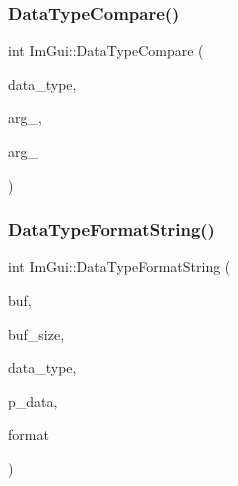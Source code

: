 \mbox{\label{namespaceImGui_aa859c7a74393669eb8418a82b5b174e7}} 
\subsubsection{\texorpdfstring{Data\+Type\+Compare()}{DataTypeCompare()}}
{\footnotesize\ttfamily int Im\+Gui\+::\+Data\+Type\+Compare (\begin{DoxyParamCaption}\item[{Im\+Gui\+Data\+Type}]{data\+\_\+type,  }\item[{const \hyperlink{imgui__impl__opengl3__loader_8h_ac668e7cffd9e2e9cfee428b9b2f34fa7}{void} $\ast$}]{arg\+\_,  }\item[{const \hyperlink{imgui__impl__opengl3__loader_8h_ac668e7cffd9e2e9cfee428b9b2f34fa7}{void} $\ast$}]{arg\+\_ }\end{DoxyParamCaption})}

\mbox{\label{namespaceImGui_a5fda8e22d0e4721940aefcb7232b1f82}} 
\subsubsection{\texorpdfstring{Data\+Type\+Format\+String()}{DataTypeFormatString()}}
{\footnotesize\ttfamily int Im\+Gui\+::\+Data\+Type\+Format\+String (\begin{DoxyParamCaption}\item[{char $\ast$}]{buf,  }\item[{int}]{buf\+\_\+size,  }\item[{Im\+Gui\+Data\+Type}]{data\+\_\+type,  }\item[{const \hyperlink{imgui__impl__opengl3__loader_8h_ac668e7cffd9e2e9cfee428b9b2f34fa7}{void} $\ast$}]{p\+\_\+data,  }\item[{const char $\ast$}]{format }\end{DoxyParamCaption})}

\mbox{\label{namespaceImGui_a5b25ed1443e5a28d5a5725892e896578}} 
